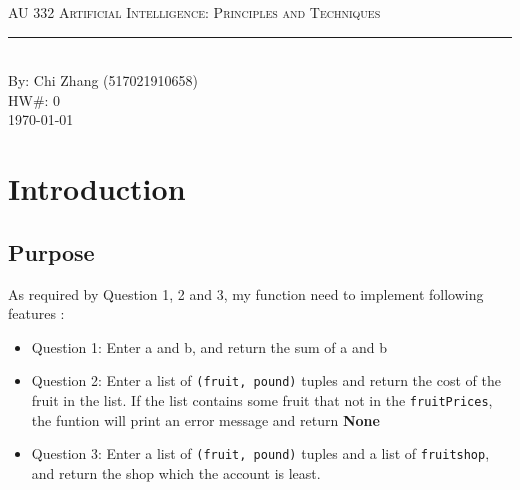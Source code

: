 \documentclass[aps,letterpaper,10pt]{revtex4}
\newcommand{\labtitle}{AU 332 Artificial Intelligence: Principles and Techniques}
\newcommand{\authorname}{Chi Zhang (517021910658)}
\newcommand{\hw}{0}
\begin{document}


\begin{titlepage}
\begin{center}
{\Large \textsc{\labtitle} \\ \vspace{4pt}}
\rule[13pt]{\textwidth}{1pt} \\ \vspace{150pt}
{\large By: \authorname \\ \vspace{10pt}
HW\#: \hw \\ \vspace{10pt}
\today}
\end{center}
\end{titlepage}





\section{Introduction}
\subsection{Purpose}

As required by Question 1, 2 and 3, my function need to implement following features :
\begin{itemize}
	\item Question 1: Enter a and b, and return the sum of a and b
	\item Question 2: Enter a list of \texttt{(fruit, pound)} tuples and return the cost of the fruit in the list. 
	If the list contains some fruit that not in the \texttt{fruitPrices}, the funtion will print an error message and return \textbf{None}
	\item Question 3: Enter a list of \texttt{(fruit, pound)} tuples and a list of \texttt{fruitshop}, 
	and return the shop which the account is least. 
\end{itemize}
\end{document}
